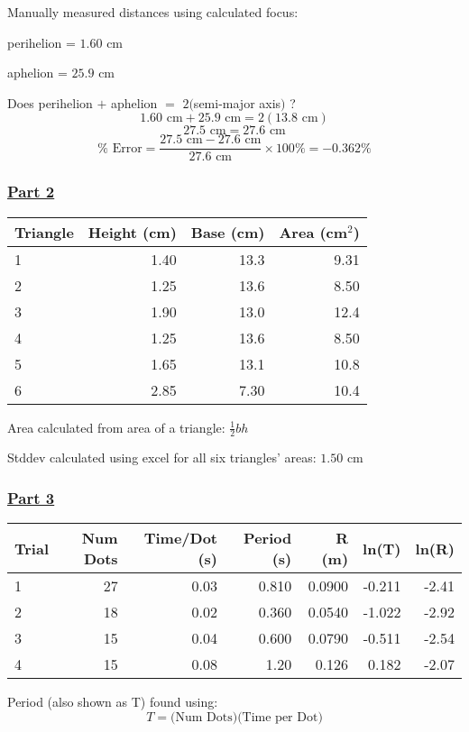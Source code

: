 \documentclass[fleqn]{article}
\begin{document}
Manually measured distances using calculated focus:

perihelion = $1.60$ cm

aphelion = $25.9$ cm

Does perihelion $+$ aphelion $=$ $2 ($semi-major axis$)$ ?
\[ 1.60 \text{ cm} + 25.9 \text{ cm} = 2(13.8 \text{ cm} ) \]
\[ 27.5 \text{ cm} = 27.6 \text{ cm}  \]
\[ \% \text{ Error} = \frac{27.5 \text{ cm} - 27.6 \text{ cm} }{27.6 \text{ cm} } \times 100 \% = -0.362 \%\]

\subsubsection*{\underline{Part 2}}
\begin{table}[H]
	\setlength{\extrarowheight}{1pt}
	\begin{tabular}{|l|r|r|r|}
		\hline
		Triangle & Height (cm) & Base (cm) & Area (cm$^2$) \\ \hline
		1        & 1.40        & 13.3      & 9.31          \\ \hline
		2        & 1.25        & 13.6      & 8.50          \\ \hline
		3        & 1.90        & 13.0      & 12.4          \\ \hline
		4        & 1.25        & 13.6      & 8.50          \\ \hline
		5        & 1.65        & 13.1      & 10.8          \\ \hline
		6        & 2.85        & 7.30      & 10.4          \\ \hline
	\end{tabular}
\end{table}
Area calculated from area of a triangle: $\frac{1}{2} bh$

Stddev calculated using excel for all six triangles' areas: $1.50$ cm

\subsubsection*{\underline{Part 3}}
\begin{table}[H]
	\begin{tabular}{|l|r|r|r|r|r|r|}
		\hline
		Trial & Num Dots & Time/Dot (s) & Period (s) & R (m)  & ln(T)  & ln(R) \\ \hline
		1     & 27       & 0.03         & 0.810      & 0.0900 & -0.211 & -2.41 \\ \hline
		2     & 18       & 0.02         & 0.360      & 0.0540 & -1.022 & -2.92 \\ \hline
		3     & 15       & 0.04         & 0.600      & 0.0790 & -0.511 & -2.54 \\ \hline
		4     & 15       & 0.08         & 1.20       & 0.126  & 0.182  & -2.07 \\ \hline
	\end{tabular}
\end{table}
Period (also shown as T) found using:
\[ T =  \text{(Num Dots)(Time per Dot)}\]
\end{document}
